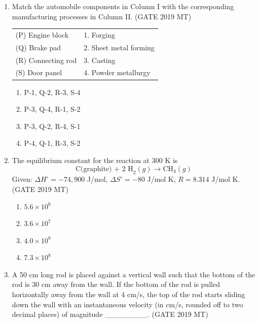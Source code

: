 \documentclass[12pt]{article}
\begin{document}
\begin{enumerate}
\item Match the automobile components in Column I with the corresponding manufacturing processes in Column II. (GATE 2019 MT)
\begin{center}
\begin{tabular}{ll}
(P) Engine block      & 1. Forging \\
(Q) Brake pad         & 2. Sheet metal forming \\
(R) Connecting rod    & 3. Casting \\
(S) Door panel        & 4. Powder metallurgy \\
\end{tabular}
\end{center}
\begin{enumerate}[label=(\alph*)]
    \item P-1, Q-2, R-3, S-4
    \item P-3, Q-4, R-1, S-2
    \item P-3, Q-2, R-4, S-1
    \item P-4, Q-1, R-3, S-2
\end{enumerate}

\item The equilibrium constant for the reaction at 300 K is
\[
\text{C(graphite) + 2 H}_2(g) \rightarrow \text{CH}_4(g)
\] 
Given: $\Delta H^\circ = -74,900$ J/mol, $\Delta S^\circ = -80$ J/mol K, $R = 8.314$ J/mol K. (GATE 2019 MT)
\begin{enumerate}[label=(\alph*)]
    \item $5.6 \times 10^6$
    \item $3.6 \times 10^7$
    \item $4.0 \times 10^8$
    \item $7.3 \times 10^8$
\end{enumerate}






















\item A 50 cm long rod is placed against a vertical wall such that the bottom of the rod is 30 cm away from the wall. If the bottom of the rod is pulled horizontally away from the wall at 4 cm/s, the top of the rod starts sliding down the wall with an instantaneous velocity (in cm/s, rounded off to two decimal places) of magnitude ________. (GATE 2019 MT)


\end{enumerate}
\end{document}
